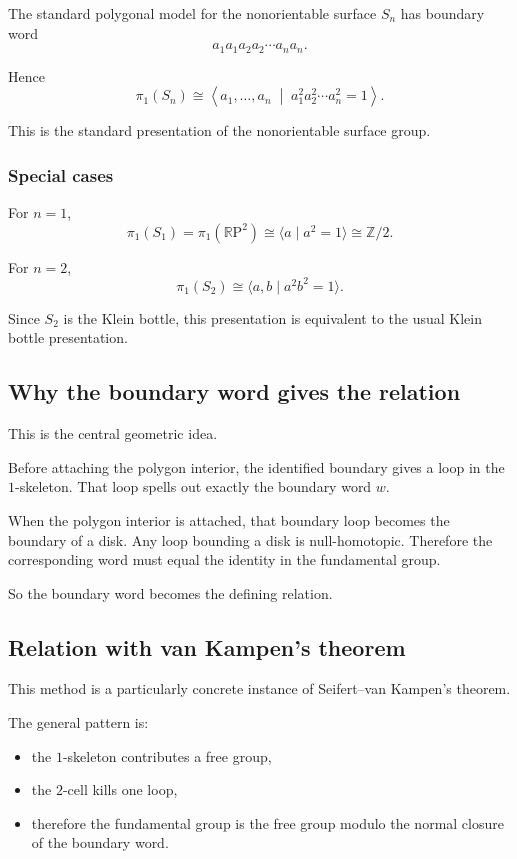 \documentclass[12pt,a4paper]{article}
\newcommand{\RP}{\mathbb{R}\mathrm{P}}
\newcommand{\Z}{\mathbb{Z}}
\theoremstyle{notespace}
\begin{document}
The standard polygonal model for the nonorientable surface \(S_n\) has boundary word
\[
a_1a_1a_2a_2\cdots a_n a_n.
\]

Hence
\[
\pi_1(S_n)\cong
\left\langle
a_1,\dots,a_n
\;\middle|\;
a_1^2a_2^2\cdots a_n^2=1
\right\rangle.
\]

This is the standard presentation of the nonorientable surface group.

\subsubsection*{Special cases}

For \(n=1\),
\[
\pi_1(S_1)=\pi_1(\RP^2)\cong \langle a\mid a^2=1\rangle \cong \Z/2.
\]

For \(n=2\),
\[
\pi_1(S_2)\cong \langle a,b\mid a^2b^2=1\rangle.
\]

Since \(S_2\) is the Klein bottle, this presentation is equivalent to the usual Klein bottle presentation.

\subsection{Why the boundary word gives the relation}

This is the central geometric idea.

Before attaching the polygon interior, the identified boundary gives a loop in the \(1\)-skeleton. That loop spells out exactly the boundary word \(w\).

When the polygon interior is attached, that boundary loop becomes the boundary of a disk. Any loop bounding a disk is null-homotopic. Therefore the corresponding word must equal the identity in the fundamental group.

So the boundary word becomes the defining relation.

\subsection{Relation with van Kampen's theorem}

This method is a particularly concrete instance of Seifert--van Kampen's theorem.

The general pattern is:
\begin{itemize}
	\item the \(1\)-skeleton contributes a free group,
	\item the \(2\)-cell kills one loop,
	\item therefore the fundamental group is the free group modulo the normal closure of the boundary word.
\end{itemize}
\end{document}
